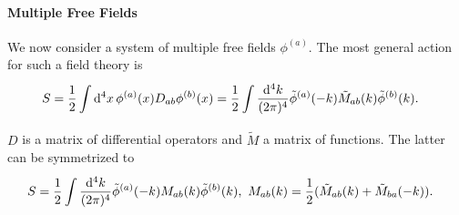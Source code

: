 \paragraph{Multiple Free Fields}
We now consider a system of multiple free fields $\phi^{(a)}$. The most general action for such a field theory is
\begin{align*}
	S &= \frac{1}{2}\int\limits_{}^{}\dd[4]{x}\phi^{(a)}(x)D_{ab}\phi^{(b)}(x) = \frac{1}{2}\int\limits_{}^{}\frac{\dd[4]{k}}{(2\pi)^{4}}\tilde{\phi}^{(a)}(-k)\tilde{M}_{ab}(k)\tilde{\phi}^{(b)}(k).
\end{align*}
$D$ is a matrix of differential operators and $\tilde{M}$ a matrix of functions. The latter can be symmetrized to
\begin{align*}
	S &= \frac{1}{2}\inte{}{}\frac{\dd[4]{k}}{(2\pi)^{4}}\tilde{\phi}^{(a)}(-k)M_{ab}(k)\tilde{\phi}^{(b)}(k),\ M_{ab}(k) = \frac{1}{2}(\tilde{M}_{ab}(k) + \tilde{M}_{ba}(-k)).
\end{align*}

